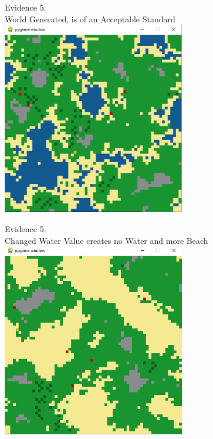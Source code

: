 \begin{flushleft}
\begin{center}
        {\large Evidence 5.\rn } \\ 
        \vspace{0.3cm}
        World Generated, is of an Acceptable Standard \\
        \includegraphics[width=8cm]{Images/Testing/T5.7.1.PNG} \\
        \vspace{1cm}

        {\large Evidence 5.\rn } \\ 
        \vspace{0.3cm}
        Changed Water Value creates no Water and more Beach \\
        \includegraphics[width=8cm]{Images/Testing/T5.8.1.PNG} \\
        \vspace{1cm}


\end{center}
\end{flushleft}
